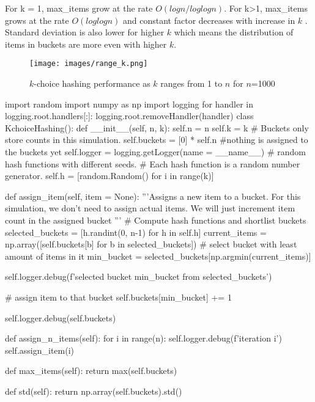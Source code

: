 \documentclass{homeworg}
\begin{document}
For k = 1, max\_items grow at the rate $O(logn/loglogn)$. For k>1, max\_items grows at the rate $O(loglogn)$ and constant factor decreases with increase in $k$ . Standard deviation is also lower for higher $k$ which means the distribution of items in buckets are more even with higher $k$.

\begin{figure}[h]
    \centering
    \texttt{[image: images/range\_k.png]}
    \caption{$k$-choice hashing performance as $k$ ranges from 1 to $n$ for $n$=1000}
    \label{fig:my_label}
\end{figure}
\begin{python}

import random
import numpy as np
import logging
for handler in logging.root.handlers[:]:
    logging.root.removeHandler(handler)
class KchoiceHashing():
    def __init__(self, n, k):
        self.n = n
        self.k = k
        # Buckets only store counts in this simulation.
        self.buckets = [0] * self.n #nothing is assigned to the buckets yet
        self.logger = logging.getLogger(name = __name__)
        # random hash functions with different seeds.
        # Each hash function is a random number generator.
        self.h = [random.Random() for i in range(k)]

    def assign_item(self, item = None):
        '''Assigns a new item to a bucket.
        For this simulation, we don't need to assign actual items.
        We will just increment item count in the assigned bucket 
        '''
        # Compute hash functions and shortlist buckets
        selected_buckets = [h.randint(0, n-1) for h in self.h]
        current_items = np.array([self.buckets[b] for b in selected_buckets])
        # select bucket with least amount of items in it
        min_bucket = selected_buckets[np.argmin(current_items)]

        self.logger.debug(f'selected bucket {min_bucket} from {selected_buckets}')

        # assign item to that bucket
        self.buckets[min_bucket] += 1

        self.logger.debug(self.buckets)

    def assign_n_items(self):
        for i in range(n):
            self.logger.debug(f'iteration {i}')
            self.assign_item(i)
    
    def max_items(self):
        return max(self.buckets)

    def std(self):
        return np.array(self.buckets).std()


\end{python}
\end{document}

